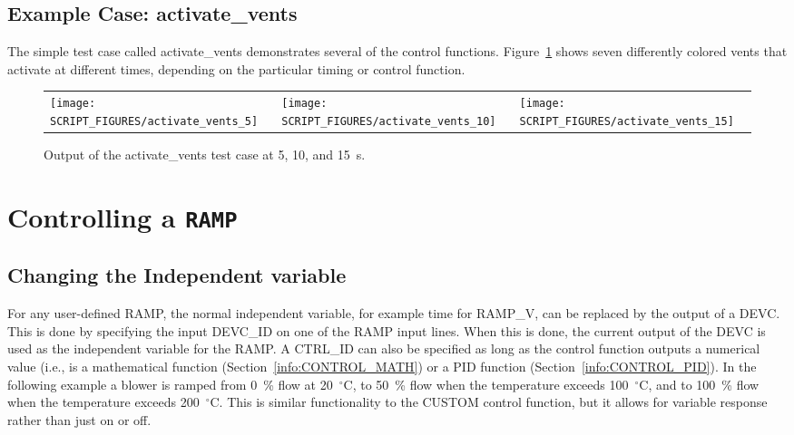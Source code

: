 \documentclass[11pt]{book}
\begin{document}
\subsection{Example Case: activate\_vents}
\label{activate_vents}

The simple test case called {\ct activate\_vents} demonstrates several of the control functions. Figure~\ref{activate_vents_fig} shows seven differently colored vents that activate at different times, depending on the particular timing or control function.
\begin{figure}[ht]
\begin{tabular*}{\textwidth}{lll}
\texttt{[image: SCRIPT\_FIGURES/activate\_vents\_5]} &
\texttt{[image: SCRIPT\_FIGURES/activate\_vents\_10]} &
\texttt{[image: SCRIPT\_FIGURES/activate\_vents\_15]}
\end{tabular*}
\caption[Snapshots of the {\ct activate\_vents} test case]{Output of the {\ct activate\_vents} test case at 5, 10, and 15~s.}
\label{activate_vents_fig}
\end{figure}




\section{Controlling a \texorpdfstring{{\tt RAMP}}{RAMP}}

\subsection{Changing the Independent variable}
\label{info:RAMPDEVC}

For any user-defined {\ct RAMP}, the normal independent variable, for example time for {\ct RAMP\_V}, can be replaced by the output of a {\ct DEVC}.
This is done by specifying the input {\ct DEVC\_ID} on one of the {\ct RAMP} input lines.  When this is done, the current output of the {\ct DEVC} is used as the independent variable for the {\ct RAMP}.  A {\ct CTRL\_ID} can also be specified as long as the control function outputs a numerical value (i.e., is a mathematical function (Section~\ref{info:CONTROL_MATH}) or a PID function (Section~\ref{info:CONTROL_PID}).
In the following example a blower is ramped from 0~\% flow at 20~$^\circ$C, to 50~\% flow when the temperature exceeds 100~$^\circ$C, and to 100~\% flow when the temperature exceeds 200~$^\circ$C.
This is similar functionality to the {\ct CUSTOM} control function, but it allows for variable response rather than just on or off.
\end{document}
